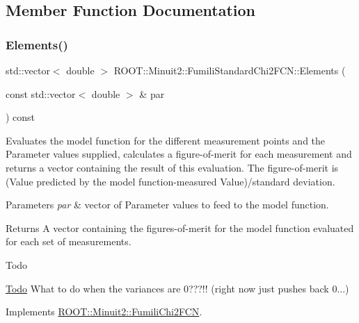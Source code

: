 \subsection{Member Function Documentation}
\mbox{\label{classROOT_1_1Minuit2_1_1FumiliStandardChi2FCN_ae7683cdbfa4160902add963d2132ab76}} 
\subsubsection{\texorpdfstring{Elements()}{Elements()}\hspace{0.1cm}{\footnotesize\ttfamily [1/2]}}
{\footnotesize\ttfamily std\+::vector$<$ double $>$ R\+O\+O\+T\+::\+Minuit2\+::\+Fumili\+Standard\+Chi2\+F\+C\+N\+::\+Elements (\begin{DoxyParamCaption}\item[{const std\+::vector$<$ double $>$ \&}]{par }\end{DoxyParamCaption}) const\hspace{0.3cm}{\ttfamily [virtual]}}

Evaluates the model function for the different measurement points and the Parameter values supplied, calculates a figure-\/of-\/merit for each measurement and returns a vector containing the result of this evaluation. The figure-\/of-\/merit is (Value predicted by the model function-\/measured Value)/standard deviation.


\begin{DoxyParams}{Parameters}
{\em par} & vector of Parameter values to feed to the model function.\\
\hline
\end{DoxyParams}
\begin{DoxyReturn}{Returns}
A vector containing the figures-\/of-\/merit for the model function evaluated for each set of measurements.
\end{DoxyReturn}
\begin{DoxyRefDesc}{Todo}
\item[\mbox{\hyperlink{todo__todo000010}{Todo}}]What to do when the variances are 0???!! (right now just pushes back 0...)\end{DoxyRefDesc}


Implements \mbox{\hyperlink{classROOT_1_1Minuit2_1_1FumiliChi2FCN_a25cc8dcc2eff831b3c0a94bf5413c2cd}{R\+O\+O\+T\+::\+Minuit2\+::\+Fumili\+Chi2\+F\+CN}}.

